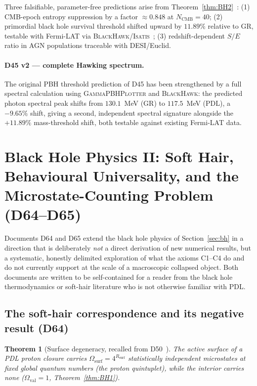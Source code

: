 \documentclass[11pt,a4paper]{article}
\theoremstyle{plain}
\newtheorem{theorem}{Theorem}[section]
\theoremstyle{definition}
\theoremstyle{remark}
\newcommand{\Rsurf}{R_{\mathrm{surf}}}
\begin{document}
Three falsifiable, parameter-free predictions arise from Theorem~\ref{thm:BH2}~\cite{D38}: (1) CMB-epoch entropy suppression by a factor $\approx 0.848$ at $N_{\mathrm{CMB}}=40$; (2) primordial black hole survival threshold shifted upward by $11.89\%$ relative to GR, testable with Fermi-LAT via \textsc{BlackHawk}/\textsc{Isatis}~\cite{D45}; (3) redshift-dependent $S/E$ ratio in AGN populations traceable with DESI/Euclid.

\paragraph{D45 v2 --- complete Hawking spectrum.} The original PBH threshold prediction of D45 has been strengthened by a full spectral calculation using \textsc{GammaPBHPlotter} and \textsc{BlackHawk}: the predicted photon spectral peak shifts from $130.1$~MeV (GR) to $117.5$~MeV (PDL), a $-9.65\%$ shift, giving a second, independent spectral signature alongside the $+11.89\%$ mass-threshold shift, both testable against existing Fermi-LAT data.

\section{Black Hole Physics II: Soft Hair, Behavioural Universality, and the Microstate-Counting Problem (D64--D65)}
\label{sec:bh2}

Documents D64 and D65 extend the black hole physics of Section~\ref{sec:bh} in a direction that is deliberately \emph{not} a direct derivation of new numerical results, but a systematic, honestly delimited exploration of what the axioms C1--C4 do and do not currently support at the scale of a macroscopic collapsed object. Both documents are written to be self-contained for a reader from the black hole thermodynamics or soft-hair literature who is not otherwise familiar with PDL.

\subsection{The soft-hair correspondence and its negative result (D64)}
\label{subsec:softhair}

\begin{theorem}[Surface degeneracy, recalled from D50~\cite{D50}]
\label{thm:D50recall}
The active surface of a PDL proton closure carries $\Omega_{\mathrm{surf}} = 4^{\Rsurf}$ statistically independent microstates at fixed global quantum numbers (the proton quintuplet), while the interior carries none ($\Omega_{\mathrm{val}}=1$, Theorem~\ref{thm:BH1}).
\end{theorem}
\end{document}
